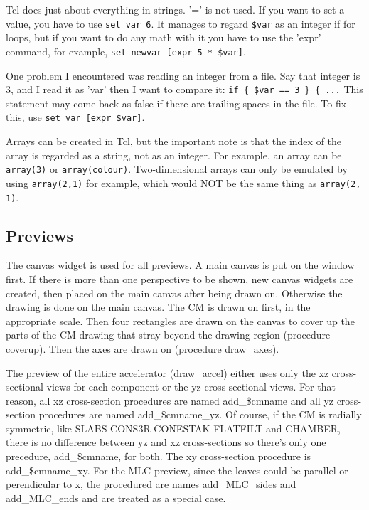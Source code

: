 \documentclass[12pt]{book}
\begin{document}
Tcl does just about everything in strings.  '=' is not used.  If you
want to set a value, you have to use {\tt set var 6}.
It manages to regard {\tt \$var} as an integer if for loops, but if you
want to do any
math with it you have to use the 'expr' command, for example,
{\tt set newvar [expr 5 * \$var]}.

One problem I encountered was reading an integer from a file.  Say that
integer is 3, and I read it as 'var' then I want to compare it:
{\tt if \{ \$var == 3 \} \{ ...}
This statement may come back as false if there are trailing
spaces in the file.  To fix this, use {\tt set var [expr \$var]}.

Arrays can be created in Tcl, but the important note is that the index
of the array is regarded as a string, not as an integer.  For example,
an array can be \verb+array(3)+ or \verb+array(colour)+.  Two-dimensional arrays
can only be emulated by using \verb+array(2,1)+ for example, which would NOT
be the same thing as \verb+array(2, 1)+.

\subsection{Previews}

The canvas widget is used for all previews.  A main canvas is put on the
window first.  If there is more than one perspective to be shown, new
canvas widgets are created, then placed on the main canvas after being
drawn on.  Otherwise the drawing is done on the main canvas.
The CM is drawn on first, in the appropriate scale.  Then four
rectangles are drawn on the canvas to cover up the parts of the CM
drawing that stray beyond the drawing region (procedure coverup).  Then
the axes are drawn on (procedure draw\_axes).

The preview of the entire accelerator (draw\_accel) either uses only the xz
cross-sectional views for each component or the yz cross-sectional
views.  For that reason, all xz
cross-section procedures are named {\sf add\_\$cmname} and all yz
cross-section procedures are named {\sf add\_\$cmname\_yz}.  Of course,
if the CM is radially symmetric, like SLABS CONS3R CONESTAK FLATFILT and
CHAMBER, there is no difference between yz and xz cross-sections so
there's only one precedure, {\sf add\_\$cmname}, for both.  The xy
cross-section procedure is {\sf add\_\$cmname\_xy}.  For the MLC
preview, since the leaves could be
parallel or perendicular to x, the procedured are names {\sf
add\_MLC\_sides} and {\sf add\_MLC\_ends} and are treated as a special
case.
\end{document}
